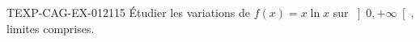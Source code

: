 \begin{exercice}{TEXP-CAG-EX-012}{1}{15}
Étudier les variations de $f(x) = x\ln x$ sur $\left]0, +\infty\right[$, limites comprises.

\end{exercice}

